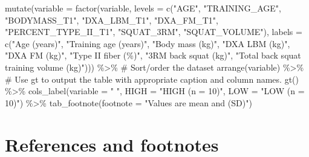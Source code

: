 \documentclass[
  11pt,
  letterpaper,
]{scrbook}
\newenvironment{Shaded}{\begin{snugshade}}{\end{snugshade}}
\newcommand{\AttributeTok}[1]{\textcolor[rgb]{0.40,0.45,0.13}{#1}}
\newcommand{\CommentTok}[1]{\textcolor[rgb]{0.37,0.37,0.37}{#1}}
\newcommand{\FunctionTok}[1]{\textcolor[rgb]{0.28,0.35,0.67}{#1}}
\newcommand{\NormalTok}[1]{\textcolor[rgb]{0.00,0.23,0.31}{#1}}
\newcommand{\SpecialCharTok}[1]{\textcolor[rgb]{0.37,0.37,0.37}{#1}}
\newcommand{\StringTok}[1]{\textcolor[rgb]{0.13,0.47,0.30}{#1}}
\begin{document}
\begin{Shaded}
\begin{Highlighting}[numbers=left,,]
  \FunctionTok{mutate}\NormalTok{(}\AttributeTok{variable =} \FunctionTok{factor}\NormalTok{(variable, }\AttributeTok{levels =} \FunctionTok{c}\NormalTok{(}\StringTok{"AGE"}\NormalTok{,}
                                                \StringTok{"TRAINING\_AGE"}\NormalTok{, }
                                                \StringTok{"BODYMASS\_T1"}\NormalTok{, }
                                                \StringTok{"DXA\_LBM\_T1"}\NormalTok{, }
                                                \StringTok{"DXA\_FM\_T1"}\NormalTok{, }
                                                \StringTok{"PERCENT\_TYPE\_II\_T1"}\NormalTok{, }
                                                \StringTok{"SQUAT\_3RM"}\NormalTok{, }
                                                \StringTok{"SQUAT\_VOLUME"}\NormalTok{), }
                                      \AttributeTok{labels =} \FunctionTok{c}\NormalTok{(}\StringTok{"Age (years)"}\NormalTok{, }
                                                \StringTok{"Training age (years)"}\NormalTok{, }
                                                \StringTok{"Body mass (kg)"}\NormalTok{, }
                                                \StringTok{"DXA LBM (kg)"}\NormalTok{, }
                                                \StringTok{"DXA FM (kg)"}\NormalTok{, }
                                                \StringTok{"Type II fiber (\%)"}\NormalTok{, }
                                                \StringTok{"3RM back squat (kg)"}\NormalTok{, }
                                                \StringTok{"Total back squat training volume (kg)"}\NormalTok{))) }\SpecialCharTok{\%\textgreater{}\%}
  \CommentTok{\# Sort/order the dataset}
  \FunctionTok{arrange}\NormalTok{(variable) }\SpecialCharTok{\%\textgreater{}\%}
  \CommentTok{\# Use gt to output the table with appropriate caption and column names. }
  \FunctionTok{gt}\NormalTok{() }\SpecialCharTok{\%\textgreater{}\%}
  \FunctionTok{cols\_label}\NormalTok{(}\AttributeTok{variable =} \StringTok{" "}\NormalTok{, }\AttributeTok{HIGH =} \StringTok{"HIGH (n = 10)"}\NormalTok{, }\AttributeTok{LOW =} \StringTok{"LOW (n = 10)"}\NormalTok{) }\SpecialCharTok{\%\textgreater{}\%}
    \FunctionTok{tab\_footnote}\NormalTok{(}\AttributeTok{footnote =} \StringTok{"Values are mean and (SD)"}\NormalTok{)}
\end{Highlighting}
\end{Shaded}

\hypertarget{references-and-footnotes-4}{%
\section{References and footnotes}\label{references-and-footnotes-4}}
\end{document}
